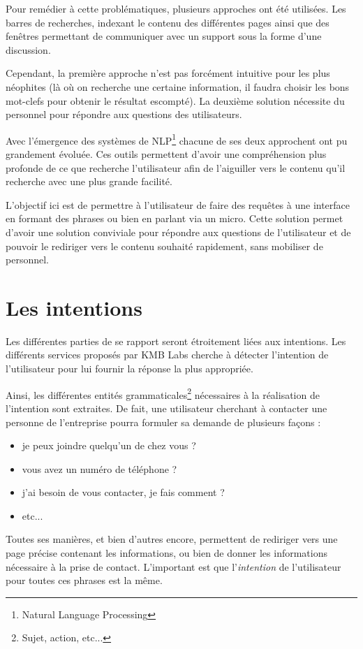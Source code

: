 \documentclass[12pt,a4paper,twoside]{scrreprt}
\begin{document}
Pour remédier à cette problématiques, plusieurs approches ont été utilisées. Les barres de recherches, indexant le contenu des différentes pages ainsi que des fenêtres permettant de communiquer avec un support sous la forme d'une discussion.

Cependant, la première approche n'est pas forcément intuitive pour les plus néophites (là où on recherche une certaine information, il faudra choisir les bons mot-clefs pour obtenir le résultat escompté). La deuxième solution nécessite du personnel pour répondre aux questions des utilisateurs.

Avec l'émergence des systèmes de NLP\footnote{Natural Language Processing} chacune de ses deux approchent ont pu grandement évoluée. Ces outils permettent d'avoir une compréhension plus profonde de ce que recherche l'utilisateur afin de l'aiguiller vers le contenu qu'il recherche avec une plus grande facilité.

L'objectif ici est de permettre à l'utilisateur de faire des requêtes à une interface en formant des phrases ou bien en parlant via un micro. Cette solution permet d'avoir une solution conviviale pour répondre aux questions de l'utilisateur et de pouvoir le rediriger vers le contenu souhaité rapidement, sans mobiliser de personnel.

\section{Les intentions}

Les différentes parties de se rapport seront étroitement liées aux intentions. Les différents services proposés par KMB Labs cherche à détecter l'intention de l'utilisateur pour lui fournir la réponse la plus appropriée.

Ainsi, les différentes entités grammaticales\footnote{Sujet, action, etc...} nécessaires à la réalisation de l'intention sont extraites. De fait, une utilisateur cherchant à contacter une personne de l'entreprise pourra formuler sa demande de plusieurs façons :
\begin{itemize}
	\item \og je peux joindre quelqu'un de chez vous ?\fg{}
	\item \og vous avez un numéro de téléphone ?\fg{}
	\item \og j'ai besoin de vous contacter, je fais comment ?\fg{}
	\item etc...
\end{itemize}

Toutes ses manières, et bien d'autres encore, permettent de rediriger vers une page précise contenant les informations, ou bien de donner les informations nécessaire à la prise de contact. L'important est que l'\textit{intention} de l'utilisateur pour toutes ces phrases est la même.
\end{document}
